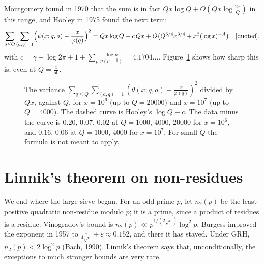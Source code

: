 \begin{remark}\label{rem:hooley}
Montgomery found in 1970 that the sum is in fact $Qx\log Q+O(Qx\log\frac{2x}Q)$ in this range, and Hooley in 1975 found the next term:
\[
\sum_{q\le Q}\sum_{(a,q)=1}\Bigl(\psi(x;q,a)-\frac x{\varphi(q)}\Bigr)^2=Qx\log Q-c\,Qx+O\bigl(Q^{5/4}x^{3/4}+x^2(\log x)^{-A}\bigr)\quad[\text{quoted}],
\]
with $c=\gamma+\log2\pi+1+\sum_p\frac{\log p}{p(p-1)}=4.1704\ldots$. Figure~\ref{fig:bdh} shows how sharp this is, even at $Q=\frac x{50}$.
\end{remark}

\begin{figure}[ht]
\centering
{}
\caption{The variance $\sum_{q\le Q}\sum_{(a,q)=1}(\theta(x;q,a)-\frac x{\varphi(q)})^2$ divided by $Qx$, against $Q$, for $x=10^6$ (up to $Q=20000$) and $x=10^7$ (up to $Q=4000$). The dashed curve is Hooley's $\log Q-c$. The data minus the curve is $0.20$, $0.07$, $0.02$ at $Q=1000$, $4000$, $20000$ for $x=10^6$, and $0.16$, $0.06$ at $Q=1000$, $4000$ for $x=10^7$. For small $Q$ the formula is not meant to apply.}
\label{fig:bdh}
\end{figure}

\section{Linnik's theorem on non-residues}

We end where the large sieve began. For an odd prime $p$, let $n_2(p)$ be the least positive quadratic non-residue modulo $p$; it is a prime, since a product of residues is a residue. Vinogradov's bound is $n_2(p)\ll p^{1/(2\sqrt e)}\log^2p$, Burgess improved the exponent in 1957 to $\frac1{4\sqrt e}+\varepsilon\approx0.152$, and there it has stayed. Under GRH, $n_2(p)<2\log^2p$ (Bach, 1990). Linnik's theorem says that, unconditionally, the exceptions to much stronger bounds are very rare.

